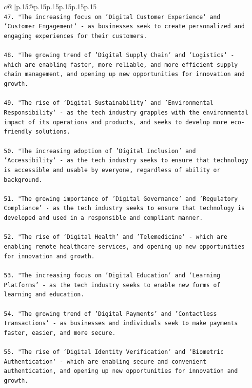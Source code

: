 \documentclass{article}
\begin{document}
{\begin{supertabular}{c@{$\;$}|p{.15\linewidth}@{}p{.15\linewidth}p{.15\linewidth}p{.15\linewidth}p{.15\linewidth}p{.15\linewidth}}
{{{\\ 
\texttt{47. "The increasing focus on 'Digital Customer Experience' and 'Customer Engagement' {-} as businesses seek to create personalized and engaging experiences for their customers.} \\
\\ 
\texttt{48. "The growing trend of 'Digital Supply Chain' and 'Logistics' {-} which are enabling faster, more reliable, and more efficient supply chain management, and opening up new opportunities for innovation and growth.} \\
\\ 
\texttt{49. "The rise of 'Digital Sustainability' and 'Environmental Responsibility' {-} as the tech industry grapples with the environmental impact of its operations and products, and seeks to develop more eco{-}friendly solutions.} \\
\\ 
\texttt{50. "The increasing adoption of 'Digital Inclusion' and 'Accessibility' {-} as the tech industry seeks to ensure that technology is accessible and usable by everyone, regardless of ability or background.} \\
\\ 
\texttt{51. "The growing importance of 'Digital Governance' and 'Regulatory Compliance' {-} as the tech industry seeks to ensure that technology is developed and used in a responsible and compliant manner.} \\
\\ 
\texttt{52. "The rise of 'Digital Health' and 'Telemedicine' {-} which are enabling remote healthcare services, and opening up new opportunities for innovation and growth.} \\
\\ 
\texttt{53. "The increasing focus on 'Digital Education' and 'Learning Platforms' {-} as the tech industry seeks to enable new forms of learning and education.} \\
\\ 
\texttt{54. "The growing trend of 'Digital Payments' and 'Contactless Transactions' {-} as businesses and individuals seek to make payments faster, easier, and more secure.} \\
\\ 
\texttt{55. "The rise of 'Digital Identity Verification' and 'Biometric Authentication' {-} which are enabling secure and convenient authentication, and opening up new opportunities for innovation and growth.} \\
\\ 
}}}
\end{supertabular}}
\end{document}
